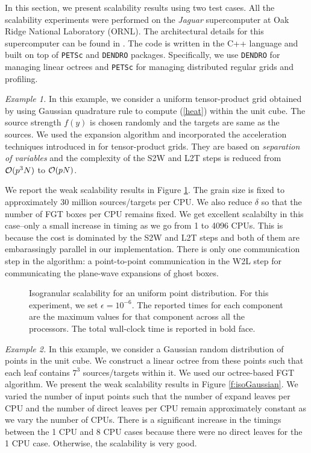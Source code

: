 
In this section, we present scalability results using two test cases.  All the scalability experiments were performed 
on the {\it{Jaguar}} supercomputer at Oak Ridge National Laboratory (ORNL). The architectural details for this supercomputer
 can be found in \cite{jaguar}. The code is written in the C++ language and built on top of \texttt{PETSc} and \texttt{DENDRO} packages. 
 Specifically, we use \texttt{DENDRO} for managing linear octrees and \texttt{PETSc} for managing distributed regular grids and profiling. 

{\em Example 1.} In this example, we consider a uniform tensor-product grid obtained by using Gaussian quadrature rule to
 compute (\ref{heat}) within the unit cube. The source strength $f(y)$ is chosen randomly and the targets are same as the
  sources. We used the expansion algorithm and incorporated the acceleration techniques
  introduced in \cite{fggt} for tensor-product grids. They are based on {\em separation of variables} and
  the complexity of the S2W and L2T steps is reduced from $\mathcal{O}(p^3 N)$ to $\mathcal{O}(p N)$. 

We report the weak scalability results in Figure \ref{f:isoUniform}. The grain size is fixed to approximately 30 million 
sources/targets per CPU. We also reduce $\delta$ so that the number of FGT boxes per CPU remains fixed. We get excellent
 scalabilty in this case--only a small increase in timing as we go from 1 to 4096 CPUs. This is  because the cost is dominated 
 by the S2W and L2T steps and both of them are embarassingly parallel in our implementation. There is only one communication 
 step in the algorithm: a point-to-point communication in the W2L step for communicating the plane-wave expansions of ghost boxes.

\begin{figure}
	\begin{center}
	
	\end{center}
\caption{\label{f:isoUniform} Isogranular scalability for an uniform point distribution. For
 this experiment, we set $\epsilon = 10^{-6}$. The reported times for 
each component are the maximum values for that component across all the processors. The total wall-clock
time is reported in bold face.} 
\end{figure}

{\em Example 2.} In this example, we consider a Gaussian random distribution of points in the unit cube. We construct
a linear octree from these points such that each leaf contains $7^3$ sources/targets within it. We used 
 our octree-based FGT algorithm. We present the weak scalability results in Figure \ref{f:isoGaussian}. We varied the
 number of input points such that the number of expand leaves per CPU and the number of direct leaves per CPU remain
  approximately constant as we vary the number of CPUs. There is a significant increase in the timings between the 
  1 CPU and 8 CPU cases because there were no direct leaves for the 1 CPU case. Otherwise, the scalability is very good.

